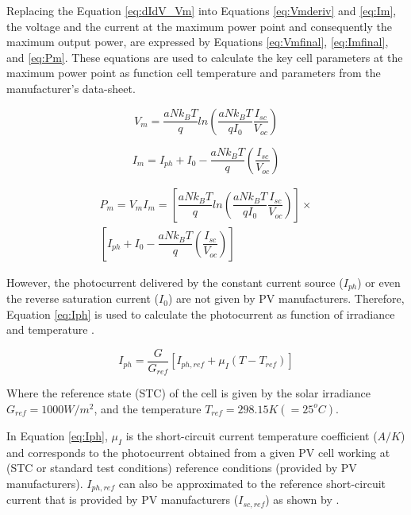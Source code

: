 \documentclass[journal]{IEEEtran}
\begin{document}
Replacing the Equation \ref{eq:dIdV_Vm} into Equations \ref{eq:Vmderiv} and \ref{eq:Im}, the voltage and the current at the maximum power point and consequently the maximum output power, are expressed by Equations \ref{eq:Vmfinal}, \ref{eq:Imfinal}, and \ref{eq:Pm}. These equations are used to calculate the key cell parameters at the maximum power point as function cell temperature and parameters from the manufacturer's data-sheet.

\begin{equation}
\label{eq:Vmfinal}
V_{m}=\dfrac{aNk_{B}T}{q} ln \left( \dfrac{aNk_{B}T}{qI_{0}} \dfrac{I_{sc}}{V_{oc}}  \right) 
\end{equation}

\begin{equation}
\label{eq:Imfinal}
I_{m} = I_{ph} + I_{0} - \dfrac{aNk_{B}T}{q} \left( \dfrac{I_{sc}}{V_{oc}} \right)  
\end{equation}

\begin{multline}
\label{eq:Pm}
P_{m} = V_{m} I_{m} = \left[ \dfrac{aNk_{B}T}{q} ln \left( \dfrac{aNk_{B}T}{qI_{0}} \dfrac{I_{sc}}{V_{oc}}  \right) \right] \times \\ \left[ I_{ph} + I_{0} - \dfrac{aNk_{B}T}{q} \left( \dfrac{I_{sc}}{V_{oc}} \right)  \right] 
\end{multline}

However, the photocurrent delivered by the constant current source ($ I_{ph} $) or even the reverse saturation current ($ I_{0} $) are not given by PV manufacturers. Therefore, Equation \ref{eq:Iph} is used to calculate the photocurrent as function of irradiance and temperature \cite{Villalva}.

\begin{equation}
\label{eq:Iph}
I_{ph}=\dfrac{G}{G_{ref}} \left[ I_{ph,ref} + \mu_{I} \left( T-T_{ref} \right)    \right] 
\end{equation}

Where the reference state (STC) of the cell is given by the solar irradiance $ G_{ref}=1000 W/m^{2} $, and the temperature $ T_{ref}=298.15 K (=25^{o}C) $.

In Equation \ref{eq:Iph}, $ \mu_{I} $ is the short-circuit current temperature coefficient ($A/K$) and corresponds to the photocurrent obtained from a given PV cell working at (STC or standard test conditions) reference conditions (provided by PV manufacturers). $ I_{ph,ref} $ can also be approximated to the reference short-circuit current that is provided by PV manufacturers ($ I_{sc,ref} $) as shown by \cite{Jakhrani}.
\end{document}
